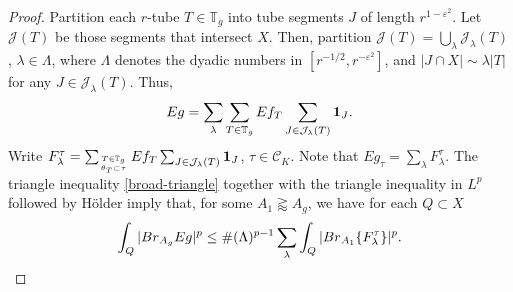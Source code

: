 \documentclass[10pt,a4paper]{amsart}
\newcommand{\Br}{{\rm{Br}}}
\newcommand{\Id}{{\bf{1}}}
\newcommand{\ZT}{\mathbb{T}}
\newcommand{\cC}{{\mathcal C}}
\newcommand{\cj}{\mathcal J}
\newcommand{\e}{\varepsilon}
\newcommand{\la}{\lambda}
\begin{document}
\begin{proof}
	
	
	\medskip
	
	
	Partition each $r$-tube $T\in\ZT_g$ into  tube segments $J$ of length $r^{1-\e^2}$. Let $\cj(T)$ be those segments that intersect $X$. 
	Then, partition  $\cj(T)=\bigcup_\la\cj_\la(T)$, $\la\in\Lambda$, where $\Lambda$ denotes the dyadic numbers in $[r^{-1/2},r^{-\e^2}]$, and $|J\cap X|\sim \la |T|$ for any $J\in\cj_\la(T)$. 
	Thus, 
	\begin{equation}
		\nonumber
		Eg=\sum_{\la}\sum_{T\in\ZT_g}Ef_{T}\sum_{J\in\cj_\la(T)}\Id_J.    
	\end{equation}
    Write $F_\lambda^\tau=\sum_{T\in\ZT_g\atop{\theta_T\subset\tau}}Ef_{T}\sum_{J\in\cj_\la(T)}\Id_J$, $\tau\in\cC_K$. Note that $Eg_\tau=\sum_{\lambda}F_\lambda^{\tau}$. The triangle  inequality \eqref{broad-triangle} together with the triangle inequality in $L^p$ followed by H\"older imply that, for some $A_1\gtrapprox A_g$, we have for each $Q\subset X$
    $$\int_{Q}|\Br_{A_g} Eg|^p\le \#(\Lambda)^{p-1}\sum_{\lambda}\int_{Q}|\Br_{A_1} \{F_\lambda^{\tau}\}|^p.$$


\end{proof}
\end{document}
